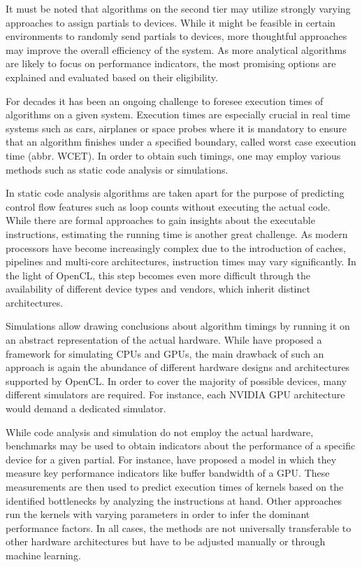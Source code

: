 It must be noted that algorithms on the second tier may utilize strongly varying approaches to assign partials to devices. While it might be feasible in certain environments to randomly send partials to devices, more thoughtful approaches may improve the overall efficiency of the system. As more analytical algorithms are likely to focus on performance indicators, the most promising options are explained and evaluated based on their eligibility.

For decades it has been an ongoing challenge to foresee execution times of algorithms on a given system. Execution times are especially crucial in real time systems such as cars, airplanes or space probes where it is mandatory to ensure that an algorithm finishes under a specified boundary, called worst case execution time (abbr. WCET). In order to obtain such timings, one may employ various methods such as static code analysis or simulations\cite{wcet}.

In static code analysis algorithms are taken apart for the purpose of predicting control flow features such as loop counts without executing the actual code\cite{loopbound}\cite{sweet}. While there are formal approaches to gain insights about the executable instructions, estimating the running time is another great challenge. As modern processors have become increasingly complex due to the introduction of caches, pipelines and multi-core architectures, instruction times may vary significantly\cite{wcet}. In the light of OpenCL, this step becomes even more difficult through the availability of different device types and vendors, which inherit distinct architectures.

Simulations allow drawing conclusions about algorithm timings by running it on an abstract representation of the actual hardware\cite{wcet}. While \citeauthor{multi2sim} have proposed a framework for simulating CPUs and GPUs\cite{multi2sim}, the main drawback of such an approach is again the abundance of different hardware designs and architectures supported by OpenCL. In order to cover the majority of possible devices, many different simulators are required. For instance, each NVIDIA GPU architecture would demand a dedicated simulator.

While code analysis and simulation do not employ the actual hardware, benchmarks may be used to obtain indicators about the performance of a specific device for a given partial. For instance, \citeauthor{quantitative_performance} have proposed a model in which they measure key performance indicators like buffer bandwidth of a GPU\cite{quantitative_performance}. These measurements are then used to predict execution times of kernels based on the identified bottlenecks by analyzing the instructions at hand. Other approaches run the kernels with varying parameters in order to infer the dominant performance factors\cite{gpgpu_performance}. In all cases, the methods are not universally transferable to other hardware architectures but have to be adjusted manually or through machine learning.

